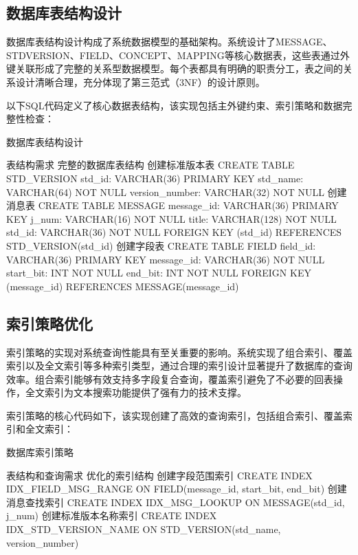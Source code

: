 \subsection{数据库表结构设计}

数据库表结构设计构成了系统数据模型的基础架构。系统设计了MESSAGE、STDVERSION、FIELD、CONCEPT、MAPPING等核心数据表，这些表通过外键关联形成了完整的关系型数据模型。每个表都具有明确的职责分工，表之间的关系设计清晰合理，充分体现了第三范式（3NF）的设计原则。

以下SQL代码定义了核心数据表结构，该实现包括主外键约束、索引策略和数据完整性检查：

\begin{algorithm}[H]
\caption{数据库表结构设计}
\begin{algorithmic}[1]
\REQUIRE 表结构需求
\ENSURE 完整的数据库表结构
\STATE 创建标准版本表
\STATE CREATE TABLE STD\_VERSION
\STATE std\_id: VARCHAR(36) PRIMARY KEY
\STATE std\_name: VARCHAR(64) NOT NULL
\STATE version\_number: VARCHAR(32) NOT NULL
\STATE 创建消息表
\STATE CREATE TABLE MESSAGE
\STATE message\_id: VARCHAR(36) PRIMARY KEY
\STATE j\_num: VARCHAR(16) NOT NULL
\STATE title: VARCHAR(128) NOT NULL
\STATE std\_id: VARCHAR(36) NOT NULL
\STATE FOREIGN KEY (std\_id) REFERENCES STD\_VERSION(std\_id)
\STATE 创建字段表
\STATE CREATE TABLE FIELD
\STATE field\_id: VARCHAR(36) PRIMARY KEY
\STATE message\_id: VARCHAR(36) NOT NULL
\STATE start\_bit: INT NOT NULL
\STATE end\_bit: INT NOT NULL
\STATE FOREIGN KEY (message\_id) REFERENCES MESSAGE(message\_id)
\end{algorithmic}
\end{algorithm}

\subsection{索引策略优化}

索引策略的实现对系统查询性能具有至关重要的影响。系统实现了组合索引、覆盖索引以及全文索引等多种索引类型，通过合理的索引设计显著提升了数据库的查询效率。组合索引能够有效支持多字段复合查询，覆盖索引避免了不必要的回表操作，全文索引为文本搜索功能提供了强有力的技术支撑。

索引策略的核心代码如下，该实现创建了高效的查询索引，包括组合索引、覆盖索引和全文索引：

\begin{algorithm}[H]
\caption{数据库索引策略}
\begin{algorithmic}[1]
\REQUIRE 表结构和查询需求
\ENSURE 优化的索引结构
\STATE 创建字段范围索引
\STATE CREATE INDEX IDX\_FIELD\_MSG\_RANGE ON FIELD(message\_id, start\_bit, end\_bit)
\STATE 创建消息查找索引
\STATE CREATE INDEX IDX\_MSG\_LOOKUP ON MESSAGE(std\_id, j\_num)
\STATE 创建标准版本名称索引
\STATE CREATE INDEX IDX\_STD\_VERSION\_NAME ON STD\_VERSION(std\_name, version\_number)
\end{algorithmic}
\end{algorithm}

